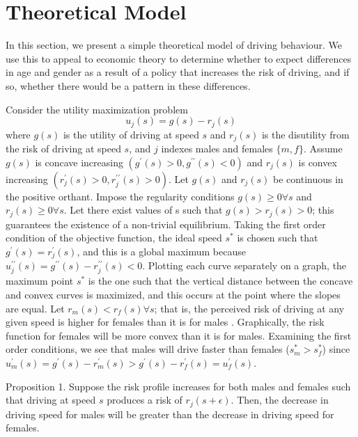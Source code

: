 \section{Theoretical Model}
\label{sec:Model}

In this section, we present a simple theoretical model of driving behaviour. We use this to appeal to economic theory to determine whether to expect differences in age and gender as a result of a policy that increases the risk of driving, and if so, whether there would be a pattern in these differences. 

Consider the utility maximization problem
%
\begin{equation}
	u_j (s) = g(s) - r_j (s)
\end{equation}
% 
where $g(s)$ is the utility of driving at speed $s$ and $r_j (s)$ is the disutility from the risk of driving at speed $s$, and $j$ indexes males and females $\{m,f\}$. Assume $g(s)$ is concave increasing $(g^{\prime} (s)>0, g^{\prime\prime} (s)<0)$ and $r_j (s)$ is convex increasing $(r_j^{\prime} (s)>0, r_j^{\prime\prime} (s)>0)$. Let $g(s)$ and $r_j (s)$ be continuous in the positive orthant. Impose the regularity conditions $g(s)\geq0 \forall s$ and $r_j (s)\geq0 \forall s$. Let there exist values of s such that $g(s)>r_j (s)>0$; this guarantees the existence of a non-trivial equilibrium. Taking the first order condition of the objective function, the ideal speed $s^*$ is chosen such that $g^{\prime} (s)=r_j^{\prime} (s)$, and this is a global maximum because $u_j^{\prime\prime} (s)=g^{\prime\prime} (s)-r_j^{\prime\prime} (s)<0$. Plotting each curve separately on a graph, the maximum point $s^*$ is the one such that the vertical distance between the concave and convex curves is maximized, and this occurs at the point where the slopes are equal. Let $r_m (s)<r_f (s)  \forall s$; that is, the perceived risk of driving at any given speed is higher for females than it is for males 
\citep{crosongneezy2009}.
Graphically, the risk function for females will be more convex than it is for males. Examining the first order conditions, we see that males will drive faster than females ($s_m^*>s_f^*$) since $u_m^{\prime} (s)=g^{\prime} (s)-r_m^{\prime} (s)>g^{\prime} (s)-r_f^{\prime} (s)=u_f^{\prime} (s)$.

Proposition 1. Suppose the risk profile increases for both males and females such that driving at speed $s$ produces a risk of $r_j (s+\epsilon)$. Then, the decrease in driving speed for males will be greater than the decrease in driving speed for females.

